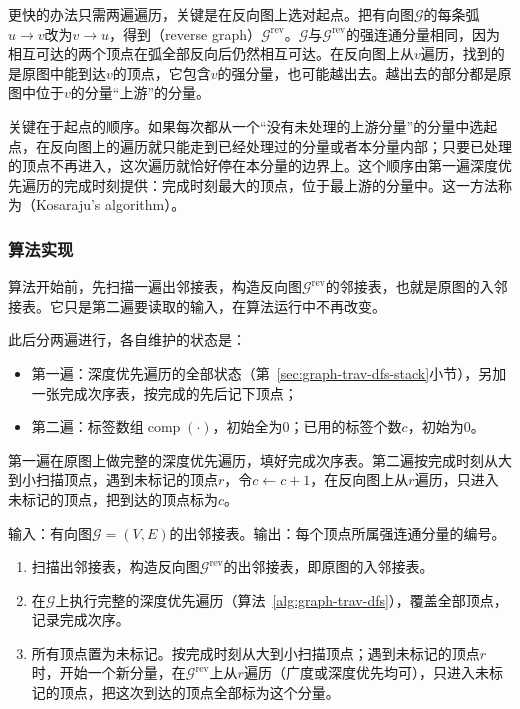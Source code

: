 更快的办法只需两遍遍历，关键是在反向图上选对起点。把有向图$\mathcal G$的每条弧$u\to v$改为$v\to u$，得到（reverse graph）$\mathcal G^{\mathrm{rev}}$。$\mathcal G$与$\mathcal G^{\mathrm{rev}}$的强连通分量相同，因为相互可达的两个顶点在弧全部反向后仍然相互可达。在反向图上从$v$遍历，找到的是原图中能到达$v$的顶点，它包含$v$的强分量，也可能越出去。越出去的部分都是原图中位于$v$的分量“上游”的分量。

关键在于起点的顺序。如果每次都从一个“没有未处理的上游分量”的分量中选起点，在反向图上的遍历就只能走到已经处理过的分量或者本分量内部；只要已处理的顶点不再进入，这次遍历就恰好停在本分量的边界上。这个顺序由第一遍深度优先遍历的完成时刻提供：完成时刻最大的顶点，位于最上游的分量中。这一方法称为（Kosaraju's algorithm）。

\subsubsection{算法实现}

算法开始前，先扫描一遍出邻接表，构造反向图$\mathcal G^{\mathrm{rev}}$的邻接表，也就是原图的入邻接表。它只是第二遍要读取的输入，在算法运行中不再改变。

此后分两遍进行，各自维护的状态是：
\begin{itemize}
  \item 第一遍：深度优先遍历的全部状态（第~\ref{sec:graph-trav-dfs-stack}小节），另加一张完成次序表，按完成的先后记下顶点；
  \item 第二遍：标签数组$\operatorname{comp}(\cdot)$，初始全为$0$；已用的标签个数$c$，初始为$0$。
\end{itemize}
第一遍在原图上做完整的深度优先遍历，填好完成次序表。第二遍按完成时刻从大到小扫描顶点，遇到未标记的顶点$r$，令$c\gets c+1$，在反向图上从$r$遍历，只进入未标记的顶点，把到达的顶点标为$c$。

\begin{algorithm}[Kosaraju强连通分量算法]
\label{alg:graph-trav-kosaraju}
输入：有向图$\mathcal G=(V,E)$的出邻接表。输出：每个顶点所属强连通分量的编号。
\begin{enumerate}
  \item 扫描出邻接表，构造反向图$\mathcal G^{\mathrm{rev}}$的出邻接表，即原图的入邻接表。
  \item 在$\mathcal G$上执行完整的深度优先遍历（算法~\ref{alg:graph-trav-dfs}），覆盖全部顶点，记录完成次序。
  \item 所有顶点置为未标记。按完成时刻从大到小扫描顶点；遇到未标记的顶点$r$时，开始一个新分量，在$\mathcal G^{\mathrm{rev}}$上从$r$遍历（广度或深度优先均可），只进入未标记的顶点，把这次到达的顶点全部标为这个分量。
\end{enumerate}
\end{algorithm}

